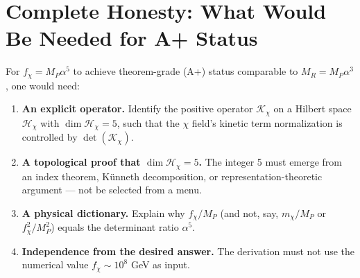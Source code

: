 \documentclass[11pt]{article}
\theoremstyle{definition}
\theoremstyle{remark}
\begin{document}
\section{Complete Honesty: What Would Be Needed for A+ Status}
\label{sec:A-grade}

For $f_\chi = M_P \alpha^5$ to achieve theorem-grade (A+) status comparable
to $M_R = M_P \alpha^3$, one would need:

\begin{enumerate}
\item \textbf{An explicit operator.} Identify the positive operator
  $\mathcal{K}_\chi$ on a Hilbert space $\mathcal{H}_\chi$ with
  $\dim \mathcal{H}_\chi = 5$, such that the $\chi$ field's kinetic term
  normalization is controlled by $\det(\mathcal{K}_\chi)$.

\item \textbf{A topological proof that $\dim \mathcal{H}_\chi = 5$.}
  The integer 5 must emerge from an index theorem, K\"unneth decomposition,
  or representation-theoretic argument --- not be selected from a menu.

\item \textbf{A physical dictionary.} Explain why $f_\chi / M_P$
  (and not, say, $m_\chi / M_P$ or $f_\chi^2 / M_P^2$) equals the
  determinant ratio $\alpha^5$.

\item \textbf{Independence from the desired answer.} The derivation must
  not use the numerical value $f_\chi \sim 10^8$ GeV as input.
\end{enumerate}
\end{document}
